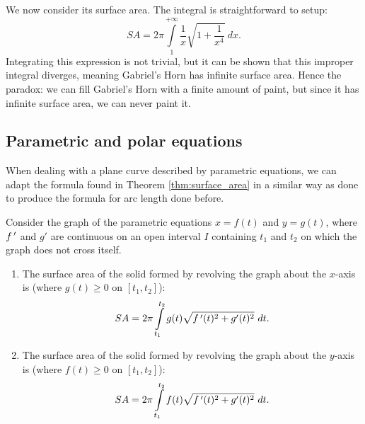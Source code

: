 \begin{example}
\ifcalculus
We now consider its surface area. The integral is straightforward to setup:
$$
SA = 2\pi\int\limits_1^{+\infty} \frac{1}{x}\sqrt{1+\dfrac{1}{x^4}}\ dx.
$$
Integrating this expression is not trivial, but it can be shown that this improper integral  diverges, meaning Gabriel's Horn has infinite surface area.
\fi
Hence the paradox: we can fill Gabriel's Horn with a finite amount of paint, but since it has infinite surface area, we can never paint it.
\enlargethispage{3\baselineskip}

\end{example}

\subsection{Parametric and polar equations}
When dealing with a plane curve described by parametric equations, we can adapt the formula found in Theorem \ref{thm:surface_area} in a similar way as done to produce the formula for arc length done before.


\begin{theorem}\label{thm:surface_area_parametric}
Consider the graph of the parametric equations $x=f(t)$ and $y=g(t)$, where $f\,'$ and $g'$ are continuous on an open interval $I$ containing $t_1$ and $t_2$ on which the graph does not cross itself.
\begin{enumerate}
	\item	The surface area of the solid formed by revolving the graph about the $x$-axis is (where $g(t)\geq 0$ on $[t_1,t_2]$):
	$$SA = 2\pi\int\limits_{t_1}^{t_2} g(t)\sqrt{f\,'(t)^2+g'(t)^2}\ dt.$$
	
	\item	The surface area of the solid formed by revolving the graph about the $y$-axis is (where $f(t)\geq 0$ on $[t_1,t_2]$):
	$$SA = 2\pi\int\limits_{t_1}^{t_2} f(t)\sqrt{f\,'(t)^2+g'(t)^2}\ dt.$$
	\end{enumerate}
\end{theorem}
	
